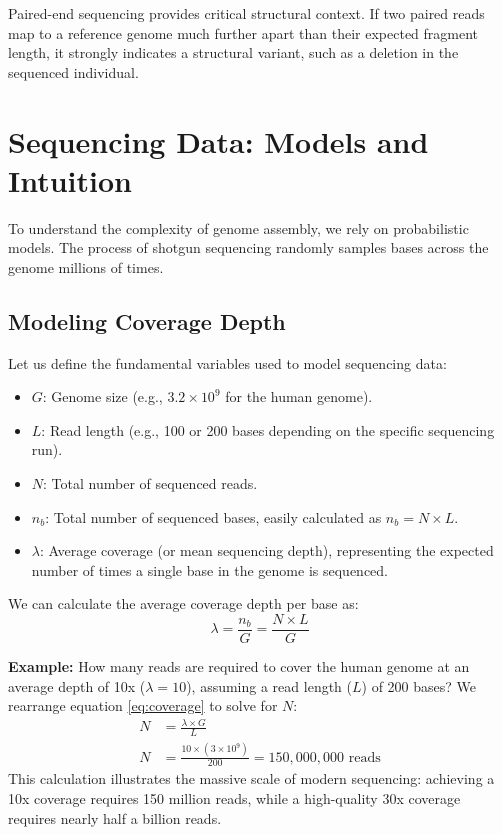 \sta Paired-end sequencing provides critical structural context. If two paired reads map to a reference genome much further apart than their expected fragment length, it strongly indicates a structural variant, such as a deletion in the sequenced individual.


\section{Sequencing Data: Models and Intuition}
To understand the complexity of genome assembly, we rely on probabilistic models. The process of shotgun sequencing randomly samples bases across the genome millions of times.

\subsection{Modeling Coverage Depth}
Let us define the fundamental variables used to model sequencing data:
\begin{itemize}
    \item \( G \): Genome size (e.g., \( 3.2 \times 10^9 \) for the human genome).
    \item \( L \): Read length (e.g., 100 or 200 bases depending on the specific sequencing run).
    \item \( N \): Total number of sequenced reads.
    \item \( n_b \): Total number of sequenced bases, easily calculated as \( n_b = N \times L \).
    \item \( \lambda \): Average coverage (or mean sequencing depth), representing the expected number of times a single base in the genome is sequenced.
\end{itemize}

We can calculate the average coverage depth per base as:
\begin{equation}
    \lambda = \frac{n_b}{G} = \frac{N \times L}{G} \label{eq:coverage}
\end{equation}

\textbf{Example:}
How many reads are required to cover the human genome at an average depth of 10x (\( \lambda = 10 \)), assuming a read length (\( L \)) of 200 bases?
We rearrange equation \eqref{eq:coverage} to solve for \( N \):
\begin{align*}
    N &= \frac{\lambda \times G}{L} \\
    N &= \frac{10 \times (3 \times 10^9)}{200} = 150,000,000 \text{ reads}
\end{align*}
This calculation illustrates the massive scale of modern sequencing: achieving a 10x coverage requires 150 million reads, while a high-quality 30x coverage requires nearly half a billion reads.

